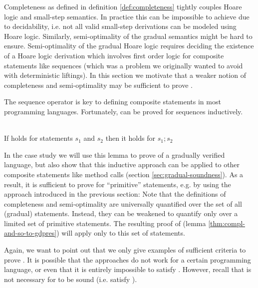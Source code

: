 Completeness as defined in definition \ref{def:completeness} tightly couples Hoare logic and small-step semantics.
In practice this can be impossible to achieve due to decidability, i.e. not all valid small-step derivations can be modeled using Hoare logic.
Similarly, semi-optimality of the gradual semantics might be hard to ensure.
Semi-optimality of the gradual Hoare logic requires deciding the existence of a Hoare logic derivation which involves first order logic for composite statements like sequences (which was a problem we originally wanted to avoid with deterministic liftings).
In this section we motivate that a weaker notion of completeness and semi-optimality may be sufficient to prove .

The sequence operator \ttt{;} is key to defining composite statements in most programming languages.
Fortunately,  can be proved for sequences inductively.
\begin{lemma}
    \label{lemma:gdpres-seq}~\\
    If  holds for statements $s_1$ and $s_2$ then it holds for $s_1;s_2$
\end{lemma}

In the case study we will use this lemma to prove  of a gradually verified language, but also show that this inductive approach can be applied to other composite statements like method calls (section \ref{sec:gradual-soundness}).
As a result, it is sufficient to prove  for “primitive” statements, e.g. by using the approach introduced in the previous section:
Note that the definitions of completeness and semi-optimality are universally quantified over the set of all (gradual) statements.
Instead, they can be weakened to quantify only over a limited set of primitive statements.
The resulting proof of  (lemma \ref{thm:compl-and-so-to-gdpres}) will apply only to this set of statements.

Again, we want to point out that we only give examples of sufficient criteria to prove .
It is possible that the approaches do not work for a certain programming language, or even that it is entirely impossible to satisfy .
However, recall that  is not necessary for \gvl to be sound (i.e. satisfy ).